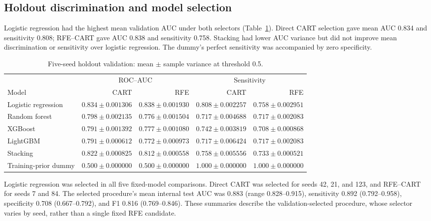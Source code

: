 \subsection{Holdout discrimination and model selection}
Logistic regression had the highest mean validation AUC under both selectors (Table~\ref{tab:building-validation-evidence}). Direct CART selection gave mean AUC 0.834 and sensitivity 0.808; RFE--CART gave AUC 0.838 and sensitivity 0.758. Stacking had lower AUC variance but did not improve mean discrimination or sensitivity over logistic regression. The dummy's perfect sensitivity was accompanied by zero specificity.

\begin{table}[tbp]
\centering
\footnotesize
\setlength{\tabcolsep}{4pt}
\caption{Five-seed holdout validation: mean $\pm$ sample variance at threshold 0.5.}
\label{tab:building-validation-evidence}
\begin{tabular}{@{}lrrrr@{}}
\toprule
& \multicolumn{2}{c}{ROC--AUC} & \multicolumn{2}{c}{Sensitivity} \\
\cmidrule(lr){2-3}\cmidrule(l){4-5}
Model & CART & RFE & CART & RFE \\
\midrule
Logistic regression & $\mathbf{0.834 \pm 0.001306}$ & $\mathbf{0.838 \pm 0.001930}$ & $\mathbf{0.808 \pm 0.002257}$ & $\mathbf{0.758 \pm 0.002951}$ \\
Random forest       & $0.798 \pm 0.002135$ & $0.776 \pm 0.001504$ & $0.717 \pm 0.004688$ & $0.717 \pm 0.002083$ \\
XGBoost             & $0.791 \pm 0.001392$ & $0.777 \pm 0.001080$ & $0.742 \pm 0.003819$ & $0.708 \pm 0.000868$ \\
LightGBM            & $0.791 \pm 0.000612$ & $0.772 \pm 0.000973$ & $0.717 \pm 0.006424$ & $0.717 \pm 0.002083$ \\
Stacking            & $0.822 \pm 0.000825$ & $0.812 \pm 0.000558$ & $0.758 \pm 0.005556$ & $0.733 \pm 0.000521$ \\
\midrule
Training-prior dummy& $0.500 \pm 0.000000$ & $0.500 \pm 0.000000$ & $1.000 \pm 0.000000$ & $1.000 \pm 0.000000$ \\
\bottomrule
\end{tabular}
\end{table}
Logistic regression was selected in all five fixed-model comparisons. Direct CART was selected for seeds 42, 21, and 123, and RFE--CART for seeds 7 and 84. The selected procedure's mean internal test AUC was 0.883 (range 0.828--0.915), sensitivity 0.892 (0.792--0.958), specificity 0.708 (0.667--0.792), and F1 0.816 (0.769--0.846). These summaries describe the validation-selected procedure, whose selector varies by seed, rather than a single fixed RFE candidate.

